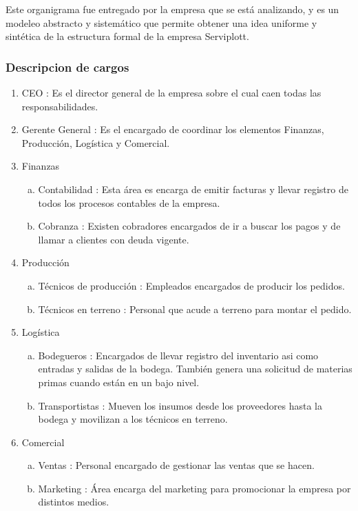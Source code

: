 	
	Este organigrama fue entregado por la empresa que se está analizando, y es un modeleo abstracto y sistemático que permite obtener una idea uniforme y sintética de la estructura formal de la empresa Serviplott.
		\subsubsection{Descripcion de cargos}
    \begin{enumerate}
    \item CEO :	Es el director general de la empresa sobre el cual caen todas las responsabilidades.
    \item Gerente General : Es el encargado de coordinar los elementos Finanzas, Producción, Logística y Comercial.
    \item Finanzas
    \begin{enumerate}[a)]
        \item Contabilidad : Esta área es encarga de emitir facturas y llevar registro de todos los procesos contables de la empresa.
        \item Cobranza : Existen cobradores encargados de ir a buscar los pagos y de llamar a clientes con deuda vigente.
    \end{enumerate}
    \item Producción
    \begin{enumerate}[a)]
        \item Técnicos de producción : Empleados encargados de producir los pedidos.
        \item Técnicos en terreno : Personal que acude a terreno para montar el pedido.
    \end{enumerate}
    \item Logística
    \begin{enumerate}[a)]
        \item Bodegueros : Encargados de llevar registro del inventario asi como entradas y salidas de la bodega. También genera una solicitud de materias primas cuando están en un bajo nivel.
        \item Transportistas : Mueven los insumos desde los proveedores hasta la bodega y movilizan a los técnicos en terreno.
    \end{enumerate}
    \item Comercial
    \begin{enumerate}[a)]
        \item Ventas : Personal encargado de gestionar las ventas que se hacen.
        \item Marketing : Área encarga del marketing para promocionar la empresa por distintos medios.\newpage
    \end{enumerate}
    \end{enumerate}
